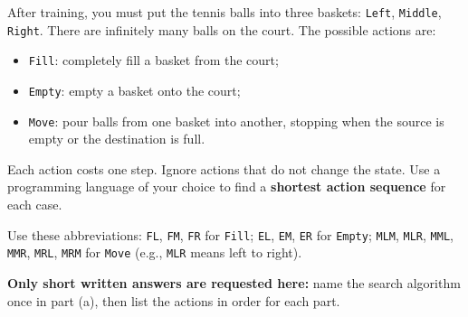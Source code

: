 \documentclass[11pt,answers]{exam}
\newcommand{\three}[3]{\langle #1,#2,#3 \rangle}
\begin{document}
\begin{questions}
\question After training, you must put the tennis balls into three baskets: \texttt{Left}, \texttt{Middle}, \texttt{Right}. There are
infinitely many balls on the court. The possible actions are:
\begin{itemize}
\item \texttt{Fill}: completely fill a basket from the court;
\item \texttt{Empty}: empty a basket onto the court;
\item \texttt{Move}: pour balls from one basket into another, stopping when
      the source is empty or the destination is full.
\end{itemize}
Each action costs one step. Ignore actions that do not change the state.
Use a programming language of your choice to find a \textbf{shortest action sequence} for each case.

Use these abbreviations: \texttt{FL}, \texttt{FM}, \texttt{FR} for
\texttt{Fill}; \texttt{EL}, \texttt{EM}, \texttt{ER} for \texttt{Empty};
\texttt{MLM}, \texttt{MLR}, \texttt{MML}, \texttt{MMR}, \texttt{MRL},
\texttt{MRM} for \texttt{Move} (e.g., \texttt{MLR} means left to right).

\textbf{Only short written answers are requested here:}
name the search algorithm once in part (a), then list the actions in order
for each part.

\end{questions}
\end{document}
